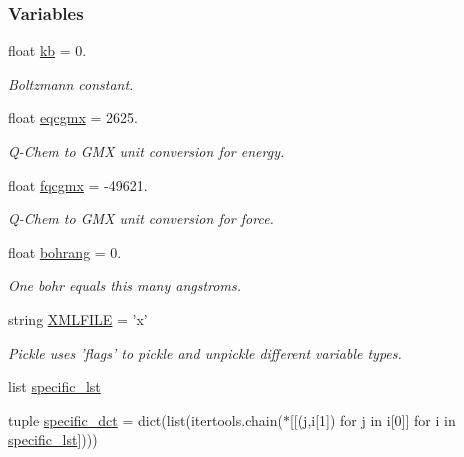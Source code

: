 \subsubsection*{Variables}
\begin{DoxyCompactItemize}
\item 
float \hyperlink{namespaceforcebalance_1_1nifty_ae0916a3186f4f8b238a0d58bb9f6a3da}{kb} = 0.
\begin{DoxyCompactList}\small\item\em Boltzmann constant. \end{DoxyCompactList}\item 
float \hyperlink{namespaceforcebalance_1_1nifty_a7cec4d46378b888cd867de05d0168d96}{eqcgmx} = 2625.
\begin{DoxyCompactList}\small\item\em Q-\/\-Chem to G\-M\-X unit conversion for energy. \end{DoxyCompactList}\item 
float \hyperlink{namespaceforcebalance_1_1nifty_ab1ec21beaae0d8328e7e4c3b89d972ab}{fqcgmx} = -\/49621.
\begin{DoxyCompactList}\small\item\em Q-\/\-Chem to G\-M\-X unit conversion for force. \end{DoxyCompactList}\item 
float \hyperlink{namespaceforcebalance_1_1nifty_a31a8d4a4240a1325bd4fa10033b7eee0}{bohrang} = 0.
\begin{DoxyCompactList}\small\item\em One bohr equals this many angstroms. \end{DoxyCompactList}\item 
string \hyperlink{namespaceforcebalance_1_1nifty_a338d5080f95188c37271c306f64093d8}{X\-M\-L\-F\-I\-L\-E} = 'x'
\begin{DoxyCompactList}\small\item\em Pickle uses 'flags' to pickle and unpickle different variable types. \end{DoxyCompactList}\item 
list \hyperlink{namespaceforcebalance_1_1nifty_abe850bcdf26cec4a0cf913a54a7ddfaa}{specific\-\_\-lst}
\item 
tuple \hyperlink{namespaceforcebalance_1_1nifty_ab652c941890b0f378100433699c8d255}{specific\-\_\-dct} = dict(list(itertools.\-chain($\ast$\mbox{[}\mbox{[}(j,i\mbox{[}1\mbox{]}) for j in i\mbox{[}0\mbox{]}\mbox{]} for i in \hyperlink{namespaceforcebalance_1_1nifty_abe850bcdf26cec4a0cf913a54a7ddfaa}{specific\-\_\-lst}\mbox{]})))
\end{DoxyCompactItemize}


